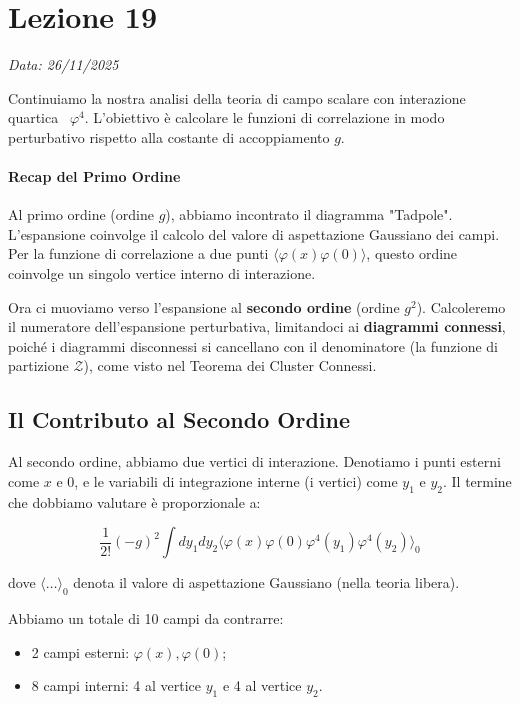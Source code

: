 \chapter{Lezione 19}
\label{chap:lezione_19}

\begin{flushright}
\textit{Data: 26/11/2025}
\end{flushright}


\noindent Continuiamo la nostra analisi della teoria di campo scalare con interazione quartica ~$\varphi^4$.
L'obiettivo è calcolare le funzioni di correlazione in modo perturbativo rispetto alla costante di accoppiamento $g$.

\subsubsection{Recap del Primo Ordine}
Al primo ordine (ordine $g$), abbiamo incontrato il diagramma "Tadpole".
L'espansione coinvolge il calcolo del valore di aspettazione Gaussiano dei campi.
Per la funzione di correlazione a due punti $\langle \varphi(x) \varphi(0) \rangle$, questo ordine coinvolge un singolo vertice interno di interazione.

Ora ci muoviamo verso l'espansione al \textbf{secondo ordine} (ordine $g^2$).
Calcoleremo il numeratore dell'espansione perturbativa, limitandoci ai \textbf{diagrammi connessi}, poiché i diagrammi disconnessi si cancellano con il denominatore (la funzione di partizione $\mathcal{Z}$), come visto nel Teorema dei Cluster Connessi.

\section{Il Contributo al Secondo Ordine}

Al secondo ordine, abbiamo due vertici di interazione.
Denotiamo i punti esterni come $x$ e $0$, e le variabili di integrazione interne (i vertici) come $y_1$ e $y_2$.
Il termine che dobbiamo valutare è proporzionale a:

\begin{equation}
    \frac{1}{2!} (-g)^2 \int dy_1 dy_2 \langle \varphi(x) \varphi(0) \varphi^4(y_1) \varphi^4(y_2) \rangle_0
\end{equation}

dove $\langle \dots \rangle_0$ denota il valore di aspettazione Gaussiano (nella teoria libera).


\noindent Abbiamo un totale di 10 campi da contrarre:
\begin{itemize}
    \item 2 campi esterni: $\varphi(x), \varphi(0)$;
    \item 8 campi interni: 4 al vertice $y_1$ e 4 al vertice $y_2$.
\end{itemize}

